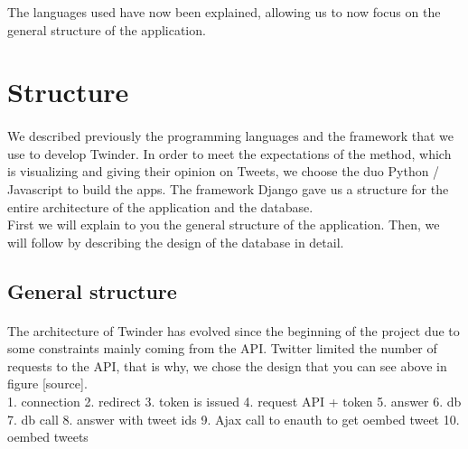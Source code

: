 The languages used have now been explained, allowing us to now focus on the general structure of the application.


\section{Structure}

\paragraph{}
We described previously the programming languages and the framework that we use to develop Twinder. In order to meet the expectations of the method, which is visualizing and giving their opinion on Tweets, we choose the duo Python / Javascript to build the apps. The framework Django gave us a structure for the entire architecture of the application and the database. \\
First we will explain to you the general structure of the application. Then, we will follow by describing the design of the database in detail.

\subsection{General structure}
\paragraph{}
The architecture of Twinder has evolved since the beginning of the project due to some constraints mainly coming from the API. Twitter limited the number of requests to the API, that is why, we chose the design that you can see above in figure [source]. \\
1. connection
2. redirect
3. token is issued
4. request API + token
5. answer
6. db
7. db call
8. answer with tweet ids
9. Ajax call to enauth to get oembed tweet 
10. oembed tweets

